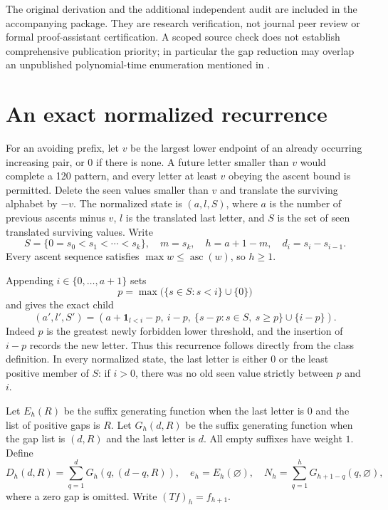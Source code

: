 \documentclass[11pt,letterpaper]{article}
\numberwithin{equation}{section}
\theoremstyle{remark}\newtheorem{remark}[theorem]{Remark}
\newcommand{\asc}{\operatorname{asc}}
\newcommand{\one}{\mathbf 1}
\begin{document}
The original derivation and the additional independent audit are included in the accompanying package. They are research verification, not journal peer review or formal proof-assistant certification. A scoped source check does not establish comprehensive publication priority; in particular the gap reduction may overlap an unpublished polynomial-time enumeration mentioned in \cite{Conway}.

\section{An exact normalized recurrence}\label{a61:fd:sec:recurrence}
For an avoiding prefix, let $v$ be the largest lower endpoint of an already occurring increasing pair, or $0$ if there is none. A future letter smaller than $v$ would complete a 120 pattern, and every letter at least $v$ obeying the ascent bound is permitted. Delete the seen values smaller than $v$ and translate the surviving alphabet by $-v$. The normalized state is $(a,l,S)$, where $a$ is the number of previous ascents minus $v$, $l$ is the translated last letter, and $S$ is the set of seen translated surviving values. Write
\[
 S=\{0=s_0<s_1<\cdots<s_k\},\quad m=s_k,\quad
 h=a+1-m,\quad d_i=s_i-s_{i-1}.
\]
Every ascent sequence satisfies $\max w\le\asc(w)$, so $h\ge1$.

Appending $i\in\{0,\ldots,a+1\}$ sets
\[
 p=\max\bigl(\{s\in S:s<i\}\cup\{0\}\bigr)
\]
and gives the exact child
\begin{equation}\label{a61:fd:eq:state}
 (a',l',S')=
 \left(a+\one_{l<i}-p,\ i-p,\ \{s-p:s\in S,\ s\ge p\}\cup\{i-p\}\right).
\end{equation}
Indeed $p$ is the greatest newly forbidden lower threshold, and the insertion of $i-p$ records the new letter. Thus this recurrence follows directly from the class definition. In every normalized state, the last letter is either $0$ or the least positive member of $S$: if $i>0$, there was no old seen value strictly between $p$ and $i$.

Let $E_h(R)$ be the suffix generating function when the last letter is $0$ and the list of positive gaps is $R$. Let $G_h(d,R)$ be the suffix generating function when the gap list is $(d,R)$ and the last letter is $d$. All empty suffixes have weight $1$. Define
\[
 D_h(d,R)=\sum_{q=1}^dG_h(q,(d-q,R)),\quad e_h=E_h(\varnothing),\quad
 N_h=\sum_{q=1}^hG_{h+1-q}(q,\varnothing),
\]
where a zero gap is omitted. Write $(Tf)_h=f_{h+1}$.
\end{document}
